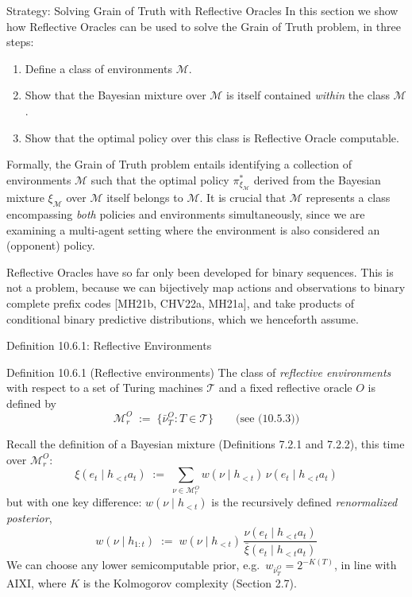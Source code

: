 \documentclass[aspectratio=169,10pt]{beamer}
\newcommand{\Mc}{\mathcal{M}}
\newcommand{\Tc}{\mathcal{T}}
\begin{document}
\begin{frame}{Strategy: Solving Grain of Truth with Reflective Oracles}
  In this section we show how Reflective Oracles can be used to solve the
  Grain of Truth problem, in three steps:
  \begin{enumerate}
    \item Define a class of environments $\Mc$.
    \item Show that the Bayesian mixture over $\Mc$ is itself contained
      \emph{within} the class $\Mc$.
    \item Show that the optimal policy over this class is Reflective
      Oracle computable.
  \end{enumerate}
  Formally, the Grain of Truth problem entails identifying a collection of
  environments $\Mc$ such that the optimal policy $\pi^*_{\xi_\Mc}$
  derived from the Bayesian mixture $\xi_\Mc$ over $\Mc$ itself belongs to
  $\Mc$. It is crucial that $\Mc$ represents a class encompassing
  \emph{both} policies and environments simultaneously, since we are
  examining a multi-agent setting where the environment is also
  considered an (opponent) policy.

  \vspace{0.3em}
  Reflective Oracles have so far only been developed for binary sequences.
  This is not a problem, because we can bijectively map actions and
  observations to binary complete prefix codes
  {\footnotesize[MH21b, CHV22a, MH21a]}, and take products of conditional
  binary predictive distributions, which we henceforth assume.
\end{frame}

\begin{frame}{Definition 10.6.1: Reflective Environments}
  \begin{block}{Definition 10.6.1 (Reflective environments)}
    The class of \emph{reflective environments} with respect to a set of
    Turing machines $\Tc$ and a fixed reflective oracle $O$ is defined by
    \[
      \Mc_r^O \;:=\; \{\bar\nu_T^O : T\in\Tc\} \qquad\text{(see (10.5.3))}
    \]
  \end{block}
  Recall the definition of a Bayesian mixture (Definitions 7.2.1 and
  7.2.2), this time over $\Mc_r^O$:
  \[
    \xi(e_t\mid h_{<t}a_t) \;:=\; \sum_{\nu\in\Mc_r^O} w(\nu\mid h_{<t})\,\nu(e_t\mid h_{<t}a_t)
  \]
  but with one key difference: $w(\nu\mid h_{<t})$ is the recursively
  defined \emph{renormalized posterior},
  \[
    w(\nu\mid h_{1:t}) \;:=\; w(\nu\mid h_{<t})\,\frac{\nu(e_t\mid h_{<t}a_t)}{\bar\xi(e_t\mid h_{<t}a_t)}
  \]
  We can choose any lower semicomputable prior, e.g.\
  $w_{\bar\nu_T^O}=2^{-K(T)}$, in line with AIXI, where $K$ is the
  Kolmogorov complexity (Section 2.7).
\end{frame}
\end{document}
